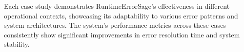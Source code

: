 Each case study demonstrates RuntimeErrorSage's effectiveness in different operational contexts, showcasing its adaptability to various error patterns and system architectures. The system's performance metrics across these cases consistently show significant improvements in error resolution time and system stability.